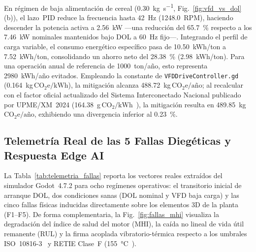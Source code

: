 En régimen de baja alimentación de cereal (\qty{0.30}{\kilogram\per\second}, Fig.~\ref{fig:vfd_vs_dol}(b)), el lazo~PID reduce la frecuencia hasta \qty{42}{\hertz} (\qty{1248.0}{RPM}), haciendo descender la potencia activa a \qty{2.56}{\kilo\watt} —una reducción del \qty{65.7}{\percent} respecto a los \qty{7.46}{\kilo\watt} nominales mantenidos bajo DOL a \qty{60}{\hertz} fijo—. Integrando el perfil de carga variable, el consumo energético específico pasa de \qty{10.50}{kWh/ton} a \qty{7.52}{kWh/ton}, consolidando un ahorro neto del \qty{28.38}{\percent} (\qty{2.98}{kWh/ton}). Para una operación anual de referencia de \qty{1000}{ton}/año, esto representa \qty{2980}{kWh}/año evitados. Empleando la constante de \texttt{VFDDriveController.gd} (\qty{0.164}{\kilogram}\,$\text{CO}_2\text{e}/\text{kWh}$), la mitigación alcanza \qty{488.72}{\kilogram}\,$\text{CO}_2\text{e}/\text{año}$; al recalcular con el factor oficial actualizado del Sistema Interconectado Nacional publicado por UPME/XM~2024 (\qty{164.38}{\gram}\,$\text{CO}_2/\text{kWh}$~\cite{UPME2024}), la mitigación resulta en \qty{489.85}{\kilogram}\,$\text{CO}_2\text{e}/\text{año}$, exhibiendo una divergencia inferior al \qty{0.23}{\percent}.

\subsection{Telemetría Real de las 5 Fallas Diegéticas y Respuesta Edge AI}

La Tabla~\ref{tab:telemetria_fallas} reporta los vectores reales extraídos del simulador Godot~4.7.2 para ocho regímenes operativos: el transitorio inicial de arranque DOL, dos condiciones sanas (DOL nominal y VFD baja carga) y las cinco fallas físicas inducidas directamente sobre los elementos 3D de la planta (F1--F5). De forma complementaria, la Fig.~\ref{fig:fallas_mhi} visualiza la degradación del índice de salud del motor (MHI), la caída no lineal de vida útil remanente (RUL) y la firma acoplada vibratorio-térmica respecto a los umbrales ISO~10816-3~\cite{ISO10816,ISO20816} y RETIE Clase~F (\qty{155}{\celsius}~\cite{RETIE2026}).

